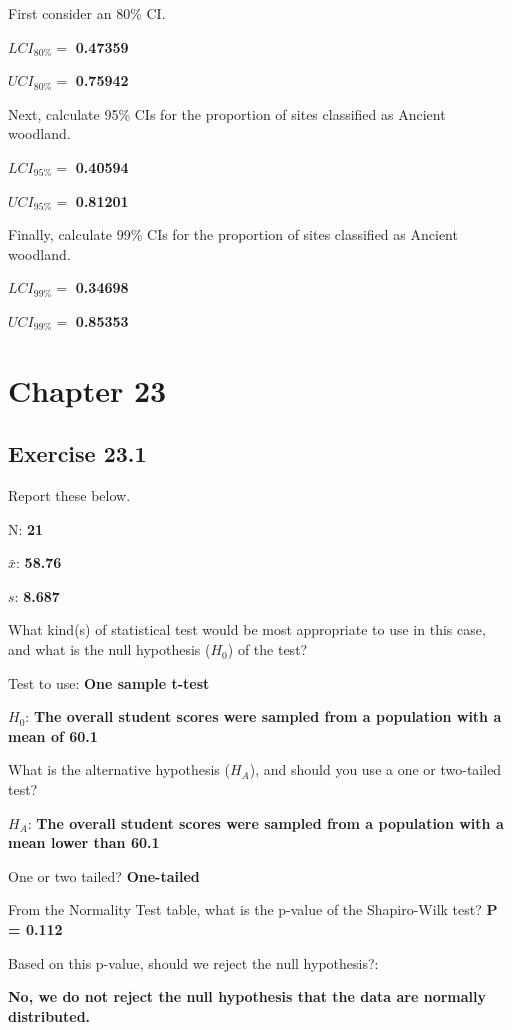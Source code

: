 \documentclass[
]{scrbook}
\begin{document}
First consider an 80\% CI.

\(LCI_{80\%} =\) \textbf{0.47359}

\(UCI_{80\%} =\) \textbf{0.75942}

Next, calculate 95\% CIs for the proportion of sites classified as Ancient woodland.

\(LCI_{95\%} =\) \textbf{0.40594}

\(UCI_{95\%} =\) \textbf{0.81201}

Finally, calculate 99\% CIs for the proportion of sites classified as Ancient woodland.

\(LCI_{99\%} =\) \textbf{0.34698}

\(UCI_{99\%} =\) \textbf{0.85353}

\hypertarget{chapter-23}{%
\section{Chapter 23}\label{chapter-23}}

\hypertarget{exercise-23.1}{%
\subsection{Exercise 23.1}\label{exercise-23.1}}

Report these below.

N: \textbf{21}

\(\bar{x}\): \textbf{58.76}

\(s\): \textbf{8.687}

What kind(s) of statistical test would be most appropriate to use in this case, and what is the null hypothesis (\(H_{0}\)) of the test?

Test to use: \textbf{One sample t-test}

\(H_{0}\): \textbf{The overall student scores were sampled from a population with a mean of 60.1}

What is the alternative hypothesis (\(H_{A}\)), and should you use a one or two-tailed test?

\(H_{A}\): \textbf{The overall student scores were sampled from a population with a mean lower than 60.1}

One or two tailed? \textbf{One-tailed}

From the Normality Test table, what is the p-value of the Shapiro-Wilk test? \textbf{P = 0.112}

Based on this p-value, should we reject the null hypothesis?:

\textbf{No, we do not reject the null hypothesis that the data are normally distributed.}
\end{document}
